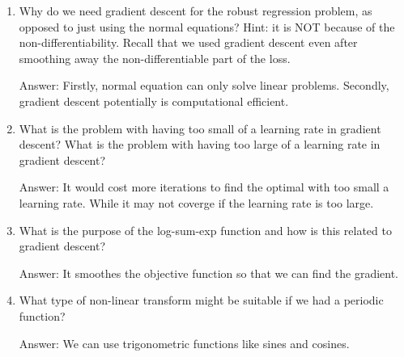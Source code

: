 \documentclass{article}
\newenvironment{answer}{\par\begingroup\color{gre}Answer: }{\endgroup}
\begin{document}
\begin{enumerate}
\begin{answer}
\end{answer}
\item Why do we need gradient descent for the robust regression problem, as opposed to just using the normal equations? Hint: it is NOT because of the non-differentiability. Recall that we used gradient descent even after smoothing away the non-differentiable part of the loss.
\begin{answer}
	Firstly, normal equation can only solve linear problems. Secondly, gradient descent potentially is computational efficient.
\end{answer}
%
\item What is the problem with having too small of a learning rate in gradient descent? What is the problem with having too large of a learning rate in gradient descent?
\begin{answer}
	It would cost more iterations to find the optimal with too small a learning rate. While it may not coverge if the learning rate is too large.
\end{answer}
\item What is the purpose of the log-sum-exp function and how is this related to gradient descent?
\begin{answer}
	It smoothes the objective function so that we can find the gradient.
\end{answer}
\item What type of non-linear transform might be suitable if we had a periodic function?
\begin{answer}
	We can use trigonometric functions like sines and cosines.
\end{answer}
\end{enumerate}
\end{document}
